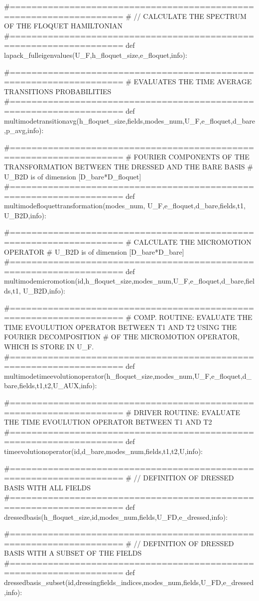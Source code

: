 \documentclass[10pt,a4paper]{article}
\begin{document}
#===================================================================
#  // CALCULATE THE SPECTRUM OF THE FLOQUET HAMILTONIAN
#===================================================================
def lapack_fulleigenvalues(U_F,h_floquet_size,e_floquet,info):    

#===================================================================
#   EVALUATES THE TIME AVERAGE TRANSITIONS PROBABILITIES
#===================================================================
def multimodetransitionavg(h_floquet_size,fields,modes_num,U_F,e_floquet,d_bare,p_avg,info):



#===================================================================
# FOURIER COMPONENTS OF THE TRANSFORMATION BETWEEN THE DRESSED AND THE BARE BASIS
# U_B2D is of dimension [D_bare*D_floquet]
#===================================================================
def multimodefloquettransformation(modes_num, U_F,e_floquet,d_bare,fields,t1, U_B2D,info): 


#===================================================================
# CALCULATE THE MICROMOTION OPERATOR
# U_B2D is of dimension [D_bare*D_bare]
#===================================================================
def multimodemicromotion(id,h_floquet_size,modes_num,U_F,e_floquet,d_bare,fields,t1, U_B2D,info):



#===================================================================
# COMP. ROUTINE: EVALUATE THE TIME EVOULUTION OPERATOR BETWEEN T1 AND T2 USING THE FOURIER DECOMPOSITION
# OF THE MICROMOTION OPERATOR, WHICH IS STORE IN U_F.
#===================================================================
def multimodetimeevolutionoperator(h_floquet_size,modes_num,U_F,e_floquet,d_bare,fields,t1,t2,U_AUX,info):



#===================================================================
# DRIVER ROUTINE: EVALUATE THE TIME EVOULUTION OPERATOR BETWEEN T1 AND T2
#===================================================================
def timeevolutionoperator(id,d_bare,modes_num,fields,t1,t2,U,info):


#===================================================================
#  // DEFINITION OF DRESSED BASIS WITH ALL FIELDS
#===================================================================
def dressedbasis(h_floquet_size,id,modes_num,fields,U_FD,e_dressed,info):


#===================================================================
#  // DEFINITION OF DRESSED BASIS WITH A SUBSET OF THE FIELDS
#===================================================================
def dressedbasis_subset(id,dressingfields_indices,modes_num,fields,U_FD,e_dressed,info):
\end{document}

